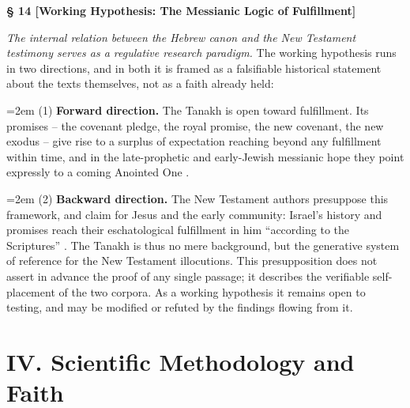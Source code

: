 \documentclass[11pt,a4paper]{article}
\makeatletter
\newcommand{\subpar}[1]{%
  \begingroup
  \leftskip=2em %
  \noindent#1\par
  \endgroup
}
\newcommand{\apthsec}[3]{%
  \phantomsection%
  \def\@currentlabel{#1}%
  \label{sec:#3}%
  \textbf{§ #1 [#2]}%
}
\makeatother
\begin{document}
\apthsec{14}{Working Hypothesis: The Messianic Logic of Fulfillment}{erfuellungslogik} 
\textit{The internal relation between the Hebrew canon and the New Testament testimony serves as a regulative research paradigm.}
The working hypothesis runs in two directions, and in both it is framed as a falsifiable historical statement about the texts themselves, not as a faith already held:

\subpar{(1) \textbf{Forward direction.} The Tanakh is open toward fulfillment. Its promises -- the covenant pledge, the royal promise, the new covenant, the new exodus -- give rise to a surplus of expectation reaching beyond any fulfillment within time, and in the late-prophetic and early-Jewish messianic hope they point expressly to a coming Anointed One \citep{zimmerli1952,vonrad1960,mowinckel1956,collins2010}.}

\subpar{(2) \textbf{Backward direction.} The New Testament authors presuppose this framework, and claim for Jesus and the early community: Israel's history and promises reach their eschatological fulfillment in him ``according to the Scriptures'' \citep{dodd1952,goppelt1939,hays1989,huebner1990,wright1992}. The Tanakh is thus no mere background, but the generative system of reference for the New Testament illocutions. This presupposition does not assert in advance the proof of any single passage; it describes the verifiable self-placement of the two corpora. As a working hypothesis it remains open to testing, and may be modified or refuted by the findings flowing from it.}

\section*{IV. Scientific Methodology and Faith}
\end{document}
